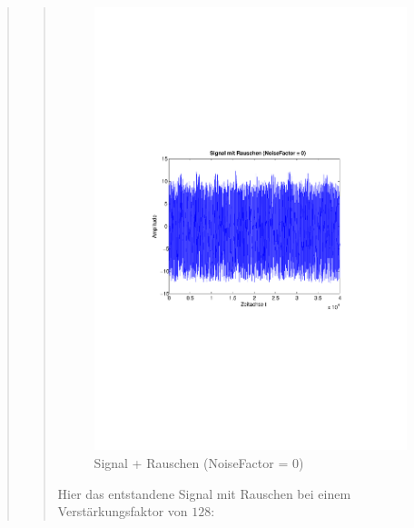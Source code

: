 \begin{quote}
\begin{quote}
         \begin{figure}[H]
        \centering
            \includegraphics[scale=0.65, trim = 1.5cm 9cm 1.5cm 9cm,
            clip]{./Bilder/aufgabe1/nf0}
                \caption{Signal + Rauschen (NoiseFactor = 0)}
        \end{figure}
        
        Hier das entstandene Signal mit Rauschen bei einem Verstärkungsfaktor
        von $128$:
        

\end{quote}
\end{quote}
